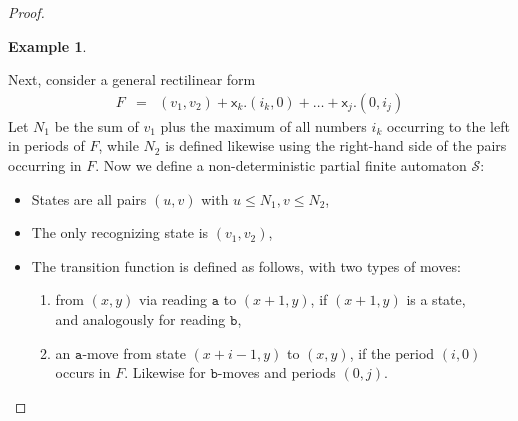 \documentclass[12pt,oneside,reqno]{amsart}
\theoremstyle{definition}
\newtheorem{example}{Example}
\begin{document}
\begin{proof}
\begin{example}
\end{example}



		    
		
	   

Next, consider a general rectilinear form 
\begin{eqnarray*} F  & = &    (v_1, v_2) + \mathsf{x}_k.(i_k,0) + \dots + \mathsf{x}_j.(0,i_j)    
\end{eqnarray*}
Let $N_1$ be the sum of $v_1$ plus the maximum of all numbers $ i_k$ occurring to the left in periods of $F$, while $N_2$ is defined likewise using the right-hand side of the pairs occurring in $F$.  Now we define a non-deterministic partial finite automaton $\mathcal{S}$:\vspace{0.5ex}
\begin{itemize}
  \item States are all pairs $(u, v)$ with $u \leq N_1, v \leq N_2$, \vspace{1mm}
    \item The only recognizing state is $(v_1, v_2)$, \vspace{1mm}
     \item The transition function is defined as follows, with two types of moves:\vspace{1mm}
     \begin{enumerate}[label=\Roman*.]
         \item \label{rom1} from $(x, y)$ via reading $\mathtt{a}$ to $(x+1, y)$, if $(x+1, y)$ is a state, \\ and analogously for reading $\mathtt{b}$,\vspace{1mm}
         \item \label{rom2} an $\mathtt{a}$-move from state $(x + i - 1, y)$ to $(x , y)$, if the period $(i, 0)$ occurs 
	in $F$. Likewise for $\mathtt{b}$-moves and periods $(0, j)$.\vspace{0.5ex}
     \end{enumerate} 
\end{itemize}


\end{proof}
\end{document}
